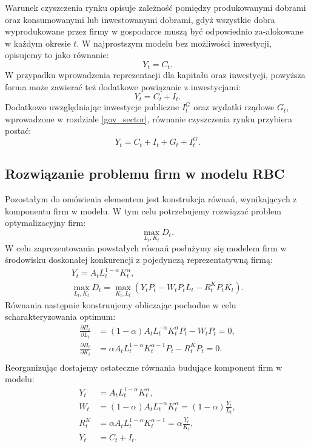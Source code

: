Warunek czyszczenia rynku opisuje zależność pomiędzy produkowanymi dobrami oraz konsumowanymi lub inwestowanymi dobrami, gdyż wszystkie dobra wyprodukowane przez firmy w gospodarce muszą być odpowiednio za-alokowane w każdym okresie $t$. W najprostszym modelu bez możliwości inwestycji, opisujemy to jako równanie:
\begin{equation}
    Y_t = C_t.
\end{equation}
W przypadku wprowadzenia reprezentacji dla kapitału oraz inwestycji, powyższa forma może zawierać też dodatkowe powiązanie z inwestycjami:
\begin{equation}
    Y_t = C_t + I_t.
\end{equation}
Dodatkowo uwzględniając inwestycje publiczne $I^G_t$ oraz wydatki rządowe $G_t$, wprowadzone w rozdziale \ref{gov_sector}, równanie czyszczenia rynku przybiera postać:
\begin{equation}
    Y_t = C_t + I_t + G_t + I^G_t.
\end{equation}

\subsection{Rozwiązanie problemu firm w modelu RBC}
\label{sec:solution_firms_rbc}

Pozostałym do omówienia elementem jest konstrukcja równań, wynikających z komponentu firm w modelu. W tym celu potrzebujemy rozwiązać problem optymalizacyjny firm:
\begin{equation}
    \max_{L_t, K_t} D_t.
\end{equation}
W celu zaprezentowania powstałych równań posłużymy się modelem firm w środowisku doskonałej konkurencji z pojedynczą reprezentatywną firmą:
\begin{gather}
    Y_t = A_t L_t^{1-\alpha} K_t^{\alpha}, \\
    \max_{L_t, K_t} D_t = \max\limits_{K_t, L_t} \left(Y_t P_t - W_t P_t L_t - R^K_t P_t K_t\right).
\end{gather}
Równania następnie konstruujemy obliczając pochodne w celu scharakteryzowania optimum:
\begin{align}
    \frac{\partial \Pi_t}{\partial L_t} &= (1-\alpha) A_t L_t^{-\alpha} K_t^{\alpha} P_t - W_t P_t = 0, \\
    \frac{\partial \Pi_t}{\partial K_t} &= \alpha A_t L_t^{1-\alpha} K_t^{\alpha-1} P_t - R^K_t P_t = 0.\\
\end{align}
Reorganizując dostajemy ostateczne równania budujące komponent firm w modelu:
\begin{align}
    Y_t &= A_t L_t^{1-\alpha} K_t^{\alpha} \label{firms:eq1},\\
    W_t &= (1-\alpha) A_t L_t^{-\alpha} K_t^{\alpha} = (1-\alpha) \frac{Y_t}{L_t} \label{firms:eq2},\\
    R^K_t &= \alpha A_t L_t^{1-\alpha} K_t^{\alpha-1} = \alpha \frac{Y_t}{K_t} \label{firms:eq3},\\
    Y_t &= C_t + I_t.
\end{align}

